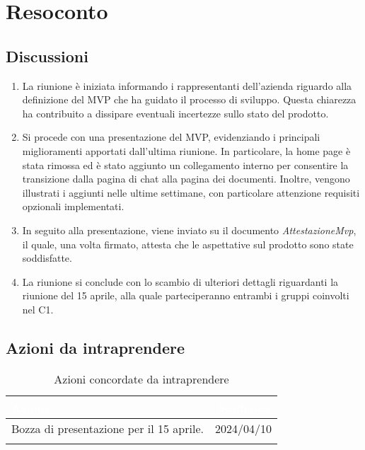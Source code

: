 \section{Resoconto} \label{sec:resoconto}
\subsection{Discussioni} \label{subsec:resdiscussione}
\begin{enumerate}
    \item La riunione è iniziata informando i rappresentanti dell'azienda  riguardo alla definizione del MVP che ha guidato il processo di sviluppo. Questa chiarezza ha contribuito a dissipare eventuali incertezze sullo stato del prodotto.
    \item Si procede con una presentazione del MVP, evidenziando i principali miglioramenti apportati dall'ultima riunione. In particolare, la home page è stata rimossa ed è stato aggiunto un collegamento interno per consentire la transizione dalla pagina di chat alla pagina dei documenti. Inoltre, vengono illustrati i  aggiunti nelle ultime settimane, con particolare attenzione  requisiti opzionali implementati.
    \item In seguito alla presentazione, viene inviato su  il documento \textit{AttestazioneMvp}, il quale, una volta firmato, attesta che le aspettative sul prodotto sono state soddisfatte.
    \item La riunione si conclude con lo scambio di ulteriori dettagli riguardanti la riunione del 15 aprile, alla quale parteciperanno entrambi i gruppi coinvolti nel  C1.
\end{enumerate}


\subsection{Azioni da intraprendere} \label{subsec:action}

{
\setlength{\tabcolsep}{10pt}
\renewcommand{\arraystretch}{1.5}
\begin{xltabular}{\textwidth}{| X | c |}
    \hline
     \textbf{\textcolor{white}{Azione}} & \textbf{\textcolor{white}{Scadenza}} \\
    \hline
    \endhead
    Bozza di presentazione per il 15 aprile.  & 2024/04/10\\
    \hline
    
     \caption{Azioni concordate da intraprendere}
    \label{tab:reqimp}
\end{xltabular}
}
